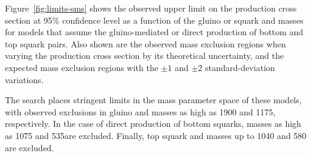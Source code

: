 Figure~\ref{fig:limits-sms} shows the observed upper limit on the
production cross section at 95\% confidence level as a function of the
gluino or squark and \chiz masses for models that assume the
gluino-mediated or direct production of bottom and top squark
pairs. Also shown are the observed mass exclusion regions when varying
the production cross section by its theoretical uncertainty, and the
expected mass exclusion regions with the ${\pm}1$ and ${\pm}2$
standard-deviation variations.

The search places stringent limits in the mass parameter space of
these models, with observed exclusions in gluino and \chiz masses as
high as 1900 and 1175\GeV, respectively. In the case of direct
production of bottom squarks, masses as high as 1075 and 535\GeV are
excluded. Finally, top squark and \chiz masses up to 1040 and 580\GeV
are excluded. 



